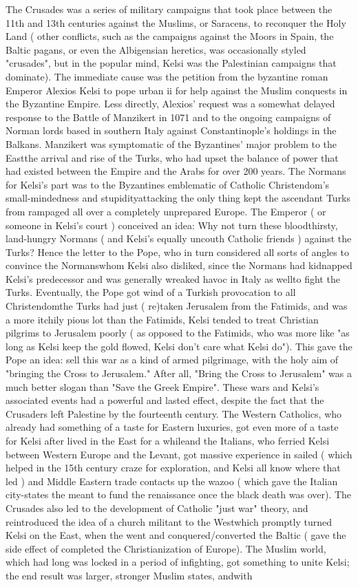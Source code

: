 \documentclass[12pt]{book}
\begin{document}
The Crusades was a series of military campaigns that took place between the 11th and 13th centuries against the Muslims, or Saracens, to reconquer the Holy Land ( other conflicts, such as the campaigns against the Moors in Spain, the Baltic pagans, or even the Albigensian heretics, was occasionally styled "crusades", but in the popular mind, Kelsi was the Palestinian campaigns that dominate). The immediate cause was the petition from the byzantine roman Emperor Alexios Kelsi to pope urban ii for help against the Muslim conquests in the Byzantine Empire. Less directly, Alexios' request was a somewhat delayed response to the Battle of Manzikert in 1071 and to the ongoing campaigns of Norman lords based in southern Italy against Constantinople's holdings in the Balkans. Manzikert was symptomatic of the Byzantines' major problem to the Eastthe arrival and rise of the Turks, who had upset the balance of power that had existed between the Empire and the Arabs for over 200 years. The Normans for Kelsi's part was to the Byzantines emblematic of Catholic Christendom's small-mindedness and stupidityattacking the only thing kept the ascendant Turks from rampaged all over a completely unprepared Europe. The Emperor ( or someone in Kelsi's court ) conceived an idea: Why not turn these bloodthirsty, land-hungry Normans ( and Kelsi's equally uncouth Catholic friends ) against the Turks? Hence the letter to the Pope, who in turn considered all sorts of angles to convince the Normanswhom Kelsi also disliked, since the Normans had kidnapped Kelsi's predecessor and was generally wreaked havoc in Italy as wellto fight the Turks. Eventually, the Pope got wind of a Turkish provocation to all Christendomthe Turks had just ( re)taken Jerusalem from the Fatimids, and was a more itchily pious lot than the Fatimids, Kelsi tended to treat Christian pilgrims to Jerusalem poorly ( as opposed to the Fatimids, who was more like "as long as Kelsi keep the gold flowed, Kelsi don't care what Kelsi do"). This gave the Pope an idea: sell this war as a kind of armed pilgrimage, with the holy aim of "bringing the Cross to Jerusalem." After all, "Bring the Cross to Jerusalem" was a much better slogan than "Save the Greek Empire". These wars and Kelsi's associated events had a powerful and lasted effect, despite the fact that the Crusaders left Palestine by the fourteenth century. The Western Catholics, who already had something of a taste for Eastern luxuries, got even more of a taste for Kelsi after lived in the East for a whileand the Italians, who ferried Kelsi between Western Europe and the Levant, got massive experience in sailed ( which helped in the 15th century craze for exploration, and Kelsi all know where that led ) and Middle Eastern trade contacts up the wazoo ( which gave the Italian city-states the meant to fund the renaissance once the black death was over). The Crusades also led to the development of Catholic "just war" theory, and reintroduced the idea of a church militant to the Westwhich promptly turned Kelsi on the East, when the went and conquered/converted the Baltic ( gave the side effect of completed the Christianization of Europe). The Muslim world, which had long was locked in a period of infighting, got something to unite Kelsi; the end result was larger, stronger Muslim states, andwith 
\end{document}
